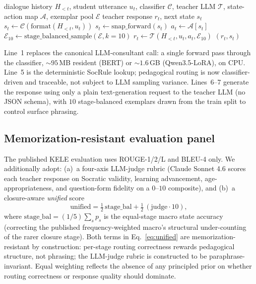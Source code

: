 \documentclass[11pt]{article}
\begin{document}
\begin{algorithm}[t]
\small
\caption{Per-turn integration pipeline}
\label{alg:integration}
\begin{algorithmic}[1]
\Require dialogue history $H_{<t}$, student utterance $u_t$, classifier $\mathcal{C}$, teacher LLM $\mathcal{T}$, state-action map $\mathcal{A}$, exemplar pool $\mathcal{E}$
\Ensure teacher response $r_t$, next state $s_t$
\State $s_t \gets \mathcal{C}(\text{format}(H_{<t}, u_t))$ 
  \State $s_t \gets \text{snap\_forward}(s_t)$ 
\EndIf
\State $a_t \gets \mathcal{A}[s_t]$ 
\State $\mathcal{E}_{10} \gets \text{stage\_balanced\_sample}(\mathcal{E}, k{=}10)$
\State $r_t \gets \mathcal{T}(H_{<t}, u_t, a_t, \mathcal{E}_{10})$
\State \Return $(r_t, s_t)$
\end{algorithmic}
\end{algorithm}

Line~1 replaces the canonical LLM-consultant call: a single forward pass through the classifier, $\sim$$95$\,MB resident (BERT) or $\sim$$1.6$\,GB (Qwen3.5-LoRA), on CPU. Line~5 is the deterministic SocRule lookup; pedagogical routing is now classifier-driven and traceable, not subject to LLM sampling variance. Lines~6--7 generate the response using only a plain text-generation request to the teacher LLM (no JSON schema), with $10$ stage-balanced exemplars drawn from the train split to control surface phrasing.

\subsection{Memorization-resistant evaluation panel}

The published KELE evaluation uses ROUGE-1/2/L and BLEU-4 only. We additionally adopt: (a)~a four-axis LLM-judge rubric (Claude Sonnet 4.6 scores each teacher response on Socratic validity, learning advancement, age-appropriateness, and question-form fidelity on a $0$--$10$ composite), and (b)~a closure-aware \emph{unified} score
\begin{equation}
\mathrm{unified} = \tfrac{1}{2}\,\mathrm{stage\_bal} + \tfrac{1}{2}\,(\mathrm{judge}\!\cdot\!10),
\label{eq:unified}
\end{equation}
where $\mathrm{stage\_bal} = (1/5)\sum_s p_s$ is the equal-stage macro state accuracy (correcting the published frequency-weighted macro's structural under-counting of the rarer closure stage). Both terms in Eq.~\ref{eq:unified} are memorization-resistant by construction: per-stage routing correctness rewards pedagogical structure, not phrasing; the LLM-judge rubric is constructed to be paraphrase-invariant. Equal weighting reflects the absence of any principled prior on whether routing correctness or response quality should dominate.
\end{document}
